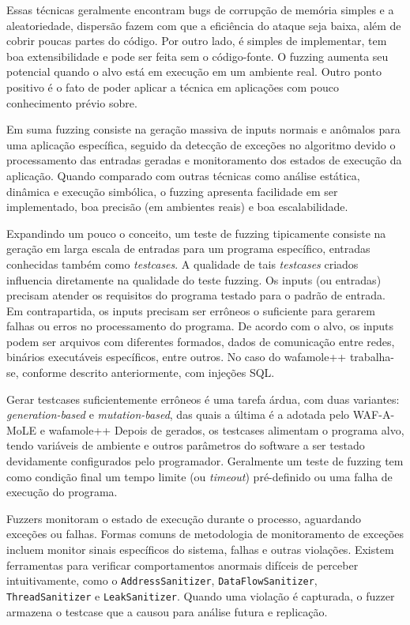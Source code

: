 Essas técnicas geralmente encontram bugs de corrupção de memória simples e a aleatoriedade, dispersão fazem com que a eficiência do ataque seja baixa, além de cobrir poucas partes do código. Por outro lado, é simples de implementar, tem boa extensibilidade e pode ser feita sem o código-fonte. O fuzzing aumenta seu potencial quando o alvo está em execução em um ambiente real. Outro ponto positivo é o fato de poder aplicar a técnica em aplicações com pouco conhecimento prévio sobre.

Em suma fuzzing consiste na geração massiva de inputs normais e anômalos para uma aplicação específica, seguido da detecção de exceções no algoritmo devido o processamento das entradas geradas e monitoramento dos estados de execução da aplicação. Quando comparado com outras técnicas como análise estática, dinâmica e execução simbólica, o fuzzing apresenta facilidade em ser implementado, boa precisão (em ambientes reais) e boa escalabilidade.

Expandindo um pouco o conceito, um teste de fuzzing tipicamente consiste na geração em larga escala de entradas para um programa específico, entradas conhecidas também como \textit{testcases}. A qualidade de tais \textit{testcases} criados influencia diretamente na qualidade do teste fuzzing. Os inputs (ou entradas) precisam atender os requisitos do programa testado para o padrão de entrada. Em contrapartida, os inputs precisam ser errôneos o suficiente para gerarem falhas ou erros no processamento do programa. De acordo com o alvo, os inputs podem ser arquivos com diferentes formados, dados de comunicação entre redes, binários executáveis específicos, entre outros. No caso do wafamole++ trabalha-se, conforme descrito anteriormente, com injeções SQL.

Gerar testcases suficientemente errôneos é uma tarefa árdua, com duas variantes: \textit{generation-based} e \textit{mutation-based}, das quais a última é a adotada pelo WAF-A-MoLE e wafamole++
Depois de gerados, os testcases alimentam o programa alvo, tendo variáveis de ambiente e outros parâmetros do software a ser testado devidamente configurados pelo programador. Geralmente um teste de fuzzing tem como condição final um tempo limite (ou \textit{timeout}) pré-definido ou uma falha de execução do programa.

Fuzzers monitoram o estado de execução durante o processo, aguardando exceções ou falhas.  Formas comuns de metodologia de monitoramento de exceções incluem monitor sinais específicos do sistema, falhas e outras violações. Existem ferramentas para verificar comportamentos anormais difíceis de perceber intuitivamente, como o \verb+AddressSanitizer+, \verb+DataFlowSanitizer+, \verb+ThreadSanitizer+ e \verb+LeakSanitizer+. Quando uma violação é capturada, o fuzzer armazena o testcase que a causou para análise futura e replicação.

